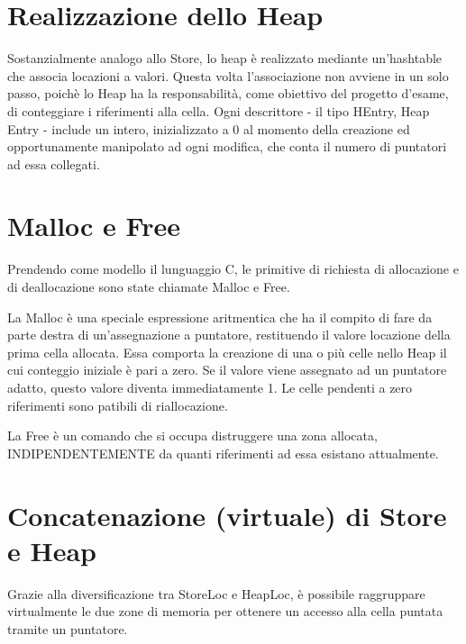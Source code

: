 \documentclass[a4paper, 12pt, bookmarks, openany]{article}
\begin{document}
\section{Realizzazione dello Heap}
Sostanzialmente analogo allo Store, lo heap \`e realizzato mediante
un'hashtable che associa locazioni a valori. Questa volta l'associazione non
avviene in un solo passo, poich\`e lo Heap ha la responsabilit\`a, come
obiettivo del progetto d'esame, di conteggiare i riferimenti alla cella.
Ogni descrittore - il tipo HEntry, Heap Entry - include un intero,
inizializzato a 0 al momento della creazione ed opportunamente manipolato
ad ogni modifica, che conta il numero di puntatori ad essa collegati.

\section{Malloc e Free}
Prendendo come modello il lunguaggio C, le primitive di richiesta di
allocazione e di deallocazione sono state chiamate Malloc e Free.

La Malloc
\`e una speciale espressione aritmentica che ha il compito di fare da parte
destra di un'assegnazione a puntatore, restituendo il valore locazione della
prima cella allocata. Essa comporta la creazione di una o pi\`u celle nello
Heap il cui conteggio iniziale \`e pari a zero. Se il valore viene assegnato
ad un puntatore adatto, questo valore diventa immediatamente 1. Le celle
pendenti a zero riferimenti sono patibili di riallocazione.

La Free
\`e un comando che si occupa distruggere una zona allocata,
INDIPENDENTEMENTE da quanti riferimenti ad essa esistano attualmente.

\section{Concatenazione (virtuale) di Store e Heap}
Grazie alla diversificazione tra StoreLoc e HeapLoc, \`e possibile
raggruppare virtualmente le due zone di memoria per ottenere un accesso alla
cella puntata tramite un puntatore.
\end{document}

